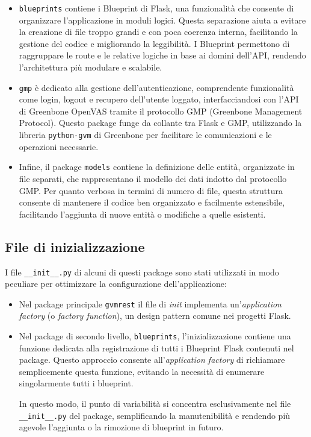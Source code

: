 \begin{itemize}
    \item \texttt{blueprints} contiene i Blueprint di Flask, una funzionalità che consente di organizzare l'applicazione in moduli logici. Questa separazione aiuta a evitare la creazione di file troppo grandi e con poca coerenza interna, facilitando la gestione del codice e migliorando la leggibilità. I Blueprint permettono di raggruppare le route e le relative logiche in base ai domini dell'API, rendendo l'architettura più modulare e scalabile.
    \item \texttt{gmp} è dedicato alla gestione dell'autenticazione, comprendente funzionalità come login, logout e recupero dell'utente loggato, interfacciandosi con l'API di Greenbone OpenVAS tramite il protocollo GMP (Greenbone Management Protocol). Questo package funge da collante tra Flask e GMP, utilizzando la libreria \texttt{python-gvm} di Greenbone per facilitare le comunicazioni e le operazioni necessarie.
    \item Infine, il package \texttt{models} contiene la definizione delle entità, organizzate in file separati, che rappresentano il modello dei dati indotto dal protocollo GMP. Per quanto verbosa in termini di numero di file, questa struttura consente di mantenere il codice ben organizzato e facilmente estensibile, facilitando l'aggiunta di nuove entità o modifiche a quelle esistenti.
\end{itemize}

\subsection{File di inizializzazione}
I file \texttt{\_\_init\_\_.py} di alcuni di questi package sono stati utilizzati in modo peculiare per ottimizzare la configurazione dell'applicazione:
\begin{itemize}
    \item Nel package principale \texttt{gvmrest} il file di \emph{init} implementa un'\emph{application factory} (o \emph{factory function}), un design pattern comune nei progetti Flask.
    \item Nel package di secondo livello, \texttt{blueprints}, l'inizializzazione contiene una funzione dedicata alla registrazione di tutti i Blueprint Flask contenuti nel package. Questo approccio consente all'\emph{application factory} di richiamare semplicemente questa funzione, evitando la necessità di enumerare singolarmente tutti i blueprint.
    
    In questo modo, il punto di variabilità si concentra esclusivamente nel file \texttt{\_\_init\_\_.py} del package, semplificando la manutenibilità e rendendo più agevole l'aggiunta o la rimozione di blueprint in futuro.
\end{itemize}

